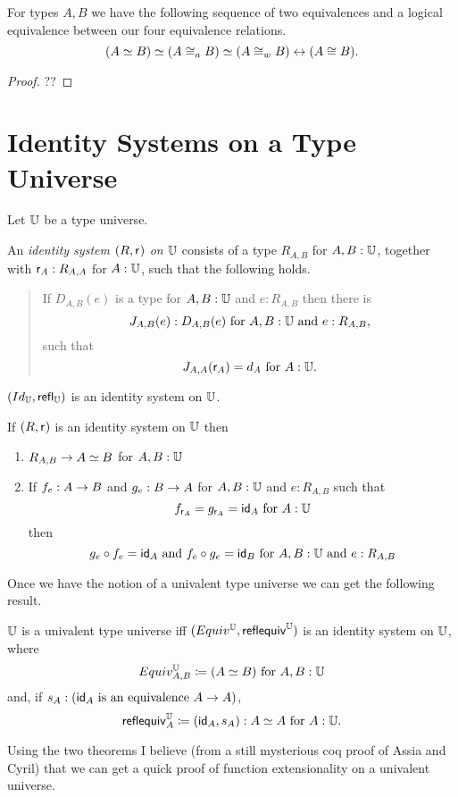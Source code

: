 \begin{cor}\label{cor:equivs-equiv}
For types $A,B$ we have the following sequence of two equivalences and a logical equivalence
between our four equivalence relations.
  \[ (\eqv A B) \simeq (A\cong_a B) \simeq (A\cong_w B) \leftrightarrow (A\cong B).\]
\end{cor}
\begin{proof} ??

\end{proof}

\section{Identity Systems on a Type Universe}
\newcommand{\sfr}[1]{{{\sf r}_{#1}}}
Let $\bbU$ be a type universe.

\begin{defn} An {\em identity system $(R,\sfr{})$ on $\bbU$} consists of a type $R_{A,B}$ for $A,B:\bbU$, together with $\sfr{A}:R_{A,A}$ for $A:\bbU$, such that the following holds.  
\begin{quote}
If $D_{A,B}(e)$ is a type for $A,B:\bbU$ and $e:R_{A,B}$ then there is   
  \[ J_{A,B}(e):D_{A,B}(e)\mbox{ for } A,B:\bbU \mbox{ and } e:R_{A,B},\] 
such that
  \[ J_{A,A}(\sfr{A})=d_A\mbox{ for } A:\bbU.\]
\end{quote}
\end{defn}
\begin{eg}
$(Id_\bbU,\refl{\bbU})$ is an identity system on $\bbU$.
\end{eg}
\begin{thm}
If $(R,\sfr{})$ is an identity system on $\bbU$ then
\begin{enumerate}
\item $R_{A,B}\ra \eqv{A}{B}$ for $A,B:\bbU$
\item If $f_e:A\ra B$ and $g_e:B\ra A$ for $A,B:\bbU$ and $e:R_{A,B}$ such that 
  \[ f_{\sfr{A}} = g_{\sfr{A}}=\idfunc[A]\mbox{ for } A:\bbU\] 
then
  \[ g_e\circ f_e =\idfunc[A]\mbox{ and } f_e\circ g_e = \idfunc[B]
      \mbox{ for }  A,B:\bbU \mbox{ and } e:R_{A,B} \]
\end{enumerate}
\end{thm}
\newcommand{\sfequiv}[1]{{\sf reflequiv}^\bbU_{#1}}
\begin{rmk} Once we have the notion of a univalent type universe we can get the following result. 
\end{rmk}
\begin{thm}
$\bbU$ is a univalent type universe iff $(Equiv^\bbU,\sfequiv{})$ is an identity system on $\bbU$, where
  \[ Equiv^\bbU_{A,B}\defeq (\eqv{A}{B})\mbox{ for } A,B:\bbU\]
and, if $s_A: (\idfunc[A]\mbox{ is an equivalence }A\ra A)$,
  \[ \sfequiv{A}\defeq (\idfunc[A],s_A):\eqv{A}{A}\mbox{ for } A:\bbU.\]
\end{thm}


Using the two theorems I believe (from a still mysterious coq proof of Assia and Cyril) that we can get a quick proof of function extensionality on a univalent universe.
